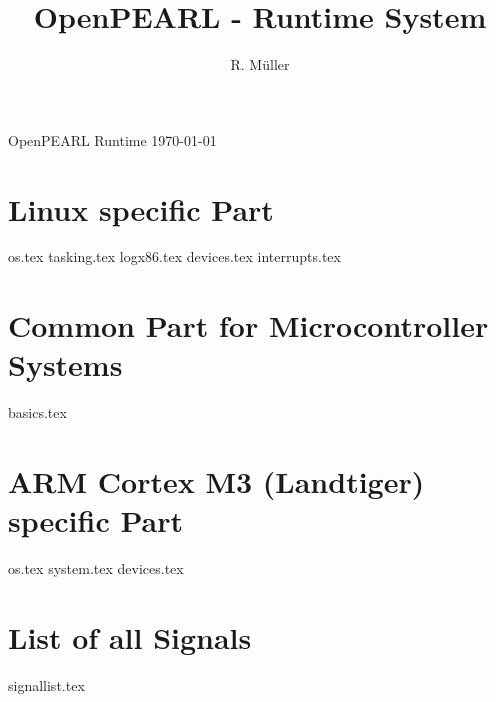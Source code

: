 \documentclass[12pt]{scrbook}
\begin{document}
\title{OpenPEARL - Runtime System}
\author{R. M\"uller}

 {
}%
{}%

 {
}%
{}%

\newenvironment{classSummary}%
{\vspace{3mm}\colorbox{black!15}{\parbox{5cm}{Class Summary}}\\
\begin{tabular}{|p{5cm}|p{9cm}|}
\hline
Item & Value \\
\hline}
{\hline\end{tabular}\vspace{3mm}}

\newenvironment{methodMapping}%
{\vspace{3mm}\colorbox{black!15}{\parbox{5cm}{Method Mapping}}\\
\begin{tabular}{|p{3cm}|p{4cm}|p{6.5cm}|}
\hline
Operation & Method & Remarks\\
\hline}
{\hline\end{tabular}\vspace{3mm}}

\pagestyle{myheadings}
 {OpenPEARL Runtime \today}

\maketitle

\tableofcontents












\chapter{Linux specific Part}
{os.tex}
{tasking.tex}
{logx86.tex}
{devices.tex}
{interrupts.tex}

\chapter{Common Part for Microcontroller Systems}
{basics.tex}

\chapter{ARM Cortex M3 (Landtiger) specific Part}
{os.tex}
{system.tex}
{devices.tex}

\chapter{List of all Signals}
{signallist.tex}


\end{document}
